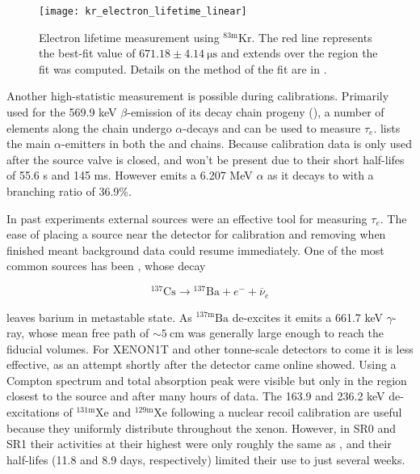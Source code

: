 \begin{figure}
\centering
\texttt{[image: kr\_electron\_lifetime\_linear]}
\caption{Electron lifetime measurement using $\mathrm{^{83m}Kr}$.  The red line represents the best-fit value of
$671.18 \pm 4.14\ \mathrm{\mu s}$ and extends over the region the fit was computed.  Details on the method of the fit are in
.}
\label{fig:det_char_elifetime_kr}
\end{figure}

Another high-statistic measurement is possible during  calibrations.  Primarily used for the 569.9 keV $\beta$-emission of
its decay chain progeny  (), a number of elements along the chain
undergo $\alpha$-decays and can be used to measure $\tau_e$.   lists the main $\alpha$-emitters in both the
 and  chains.  Because  calibration
data is only used after the source valve is closed,  and  won't be present due to their short half-lifes of
55.6 s and 145 ms.  However  emits a 6.207 MeV $\alpha$ as it decays to  with a
branching ratio of 36.9\%.

In past experiments external \gammaray sources were an effective tool for measuring $\tau_e$.  The ease of placing a source near the
detector for calibration and removing when finished meant background data could resume immediately.  One of the most common sources has
been , whose decay

\begin{equation}
\mathrm{^{137}Cs} \rightarrow \mathrm{^{137}Ba} + e^- + \overline{\nu}_e
\end{equation}

\noindent leaves barium in metastable state.  As $\mathrm{^{137m}Ba}$ de-excites it emits a 661.7 keV $\gamma$-ray, whose mean
free path of ${\sim}5\ \mathrm{cm}$ was generally large enough to reach the fiducial volumes.  For
XENON1T and other tonne-scale detectors to come it is less effective, as an attempt shortly after the detector came online showed.  Using
 a Compton spectrum and total absorption peak were visible but only in the region closest to the source and after many hours
of data.  The 163.9 and 236.2 keV de-excitations of $\mathrm{^{131m}Xe}$ and $\mathrm{^{129m}Xe}$ following a nuclear
recoil calibration are useful because they uniformly distribute throughout the xenon.  However, in SR0 and SR1 their activities at their
highest were only roughly the same as , and their half-lifes (11.8 and 8.9 days, respectively) limited their use to just
several weeks.

